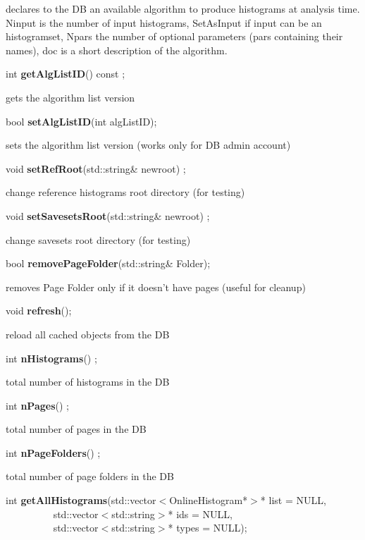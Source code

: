  declares to the DB an available algorithm to produce histograms at
 analysis time. Ninput is the number of input histograms, SetAsInput
 if input can be an histogramset, Npars the
 number of optional parameters (pars containing their names), doc is a short
 description of the algorithm.


\item    int {\bf getAlgListID}() const ;

 gets the algorithm list version


\item    bool {\bf setAlgListID}(int algListID);


 sets the algorithm list version (works only for DB admin account)


\item    void {\bf setRefRoot}(std::string\& newroot) ;

 change reference histograms root directory (for testing)


\item    void {\bf setSavesetsRoot}(std::string\& newroot) ;

 change savesets root directory (for testing)


\item    bool {\bf removePageFolder}(std::string\& Folder);


 removes Page Folder only if it doesn't have pages (useful for cleanup)


\item    void {\bf refresh}();


 reload all cached objects from the DB


\item    int {\bf nHistograms}() ;

 total number of histograms in the DB


\item    int {\bf nPages}() ;

 total number of pages in the DB


\item    int {\bf nPageFolders}() ;

  total number of page folders in the DB


\item    int {\bf getAllHistograms}(std::vector$<$OnlineHistogram*$>$* list = NULL,\\\mbox{}~~~~~~~~~
		       std::vector$<$std::string$>$* ids = NULL,\\\mbox{}~~~~~~~~~
		       std::vector$<$std::string$>$* types = NULL);

